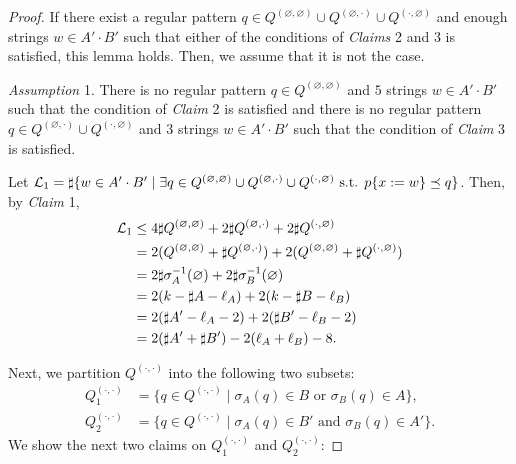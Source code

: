 \begin{proof}
\smallskip

\noindent
If there exist a regular pattern $q \in Q^{(\varnothing,\varnothing)} \cup Q^{(\varnothing,\cdot)} \cup Q^{(\cdot,\varnothing)}$ and enough strings $w \in A'\cdot B'$ such that either of the conditions of \textit{Claims} 2 and 3 is satisfied, this lemma holds. Then, we assume that it is not the case.

\smallskip

\noindent
\textit{Assumption} 1.
There is no regular pattern $q \in Q^{(\varnothing,\varnothing)}$ and $5$ strings $w \in A'\cdot B'$ such that the condition of \textit{Claim} 2 is satisfied and there is no regular pattern $q \in Q^{(\varnothing,\cdot)} \cup Q^{(\cdot,\varnothing)}$ and $3$ strings $w \in A'\cdot B'$ such that the condition of \textit{Claim} 3 is satisfied.

\smallskip

\noindent
Let ${\cal L}_{1} = \sharp\{w \in A'\cdot B' \mid \exists q \in Q^{(\varnothing,\varnothing)} \cup Q^{(\varnothing,\cdot)} \cup Q^{(\cdot,\varnothing)} \mbox{ s.t. } p\{x:=w\} \preceq q\}$.
Then, by \textit{Claim} 1,
\begin{align*}
  {\cal L}_{1} &\leq 4\sharp Q^{(\varnothing,\varnothing)} + 2\sharp Q^{(\varnothing,\cdot)} + 2\sharp Q^{(\cdot,\varnothing)}\\
  & = 2(Q^{(\varnothing,\varnothing)} + \sharp Q^{(\varnothing,\cdot)}) + 2(Q^{(\varnothing,\varnothing)} + \sharp Q^{(\cdot,\varnothing)})\\
  & = 2\sharp \sigma_{A}^{-1}(\varnothing) + 2\sharp \sigma_{B}^{-1}(\varnothing)\\
  & = 2(k - \sharp A - \ell_{A}) + 2(k - \sharp B - \ell_{B})\\
  & = 2(\sharp A' - \ell_{A} - 2) + 2(\sharp B' - \ell_{B} - 2)\\
  & = 2(\sharp A' + \sharp B') - 2(\ell_{A} + \ell_{B}) - 8.
\end{align*}

Next, we partition $Q^{(\cdot,\cdot)}$ into the following two subsets:
\begin{align*}
  Q_{1}^{(\cdot,\cdot)} & = \{q \in Q^{(\cdot,\cdot)} \mid \sigma_{A}(q) \in B \mbox{ or } \sigma_{B}(q) \in A\},\\
  Q_{2}^{(\cdot,\cdot)} & = \{q \in Q^{(\cdot,\cdot)} \mid \sigma_{A}(q) \in B' \mbox{ and } \sigma_{B}(q) \in A'\}.
\end{align*}
We show the next two claims on $Q_{1}^{(\cdot,\cdot)}$ and $Q_{2}^{(\cdot,\cdot)}$:


\end{proof}
